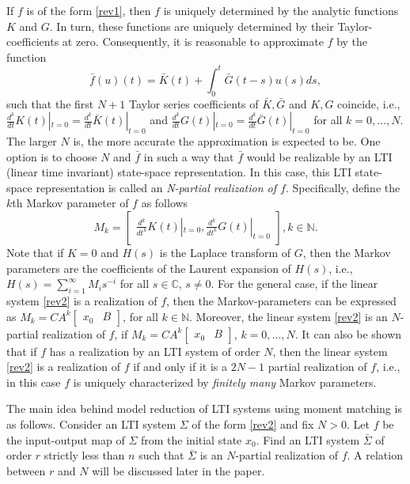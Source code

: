 \documentclass[journal]{IEEEtran}
\begin{document}
If $f$ is of the form \eqref{rev1}, then $f$ is uniquely determined by the analytic functions $K$ and $G$. In turn, these functions are uniquely determined by their Taylor-coefficients at zero. Consequently, it is reasonable to approximate $f$ by the function
\[
\bar{f}(u)(t)=\bar{K}(t)+\int^{t}_{0} \bar{G}(t-s)u(s)ds,
\]
such that the first $N+1$ Taylor series coefficients of $\bar{K},\bar{G}$ and $K,G$ coincide, i.e., $\frac{d^k}{dt} K(t)|_{t=0}=\frac{d^k}{dt} \bar{K}(t)|_{t=0}$ and $\frac{d^k}{dt} G(t)|_{t=0}=\frac{d^k}{dt} \bar{G}(t)|_{t=0}$ for all $k=0,\ldots, N$.
The larger $N$ is, the more accurate the approximation is expected to be. One option is to choose $N$ and $\bar{f}$ in such a way that $\bar{f}$ would be realizable by an LTI (linear time invariant) state-space representation. In this case, this LTI state-space representation is called an \emph{N-partial realization of $f$}. Specifically, define the $k$th Markov parameter of $f$ as follows
\begin{equation}
	\label{rev1:markov}
	M_{k}=\begin{bmatrix} \frac{d^k}{dt^k} K(t)|_{t=0} ,
		\frac{d^k}{dt^k} G(t)|_{t=0} \end{bmatrix}, k \in \mathbb{N}.
\end{equation}
Note that if $K=0$ and $H(s)$ is the Laplace transform of $G$, then the Markov parameters are the coefficients of the Laurent expansion of $H(s)$, i.e., $H(s)=\sum_{i=1}^{\infty} M_is^{-i}$ for all $s \in \mathbb{C}$, $s \ne 0$. For the general case, if the linear system \eqref{rev2} is a realization of $f$, then the Markov-parameters can be expressed as $M_{k}=CA^k\begin{bmatrix} x_0 & B \end{bmatrix}$, for all $k \in \mathbb{N}$. Moreover, the linear system \eqref{rev2} is an $N$-partial realization of $f$, if $M_{k}=CA^k\begin{bmatrix} x_0 & B \end{bmatrix}$, $k=0,\ldots,N$. It can also be shown that if $f$ has a realization by an LTI system of order $N$, then the linear system \eqref{rev2} is a realization of $f$ if and only if it is a $2N-1$ partial realization of $f$, i.e., in this case $f$ is uniquely characterized by \emph{finitely many} Markov parameters.

The main idea behind model reduction of LTI systems using moment matching is as follows. Consider an LTI system $\Sigma$ of the form \eqref{rev2} and fix $N > 0$. Let $f$ be the input-output map of $\Sigma$ from the initial state $x_0$. Find an LTI system $\bar{\Sigma}$ of order $r$ strictly less than $n$ such that $\bar{\Sigma}$ is an $N$-partial realization of $f$. A relation between $r$ and $N$ will be discussed later in the paper.
\end{document}
